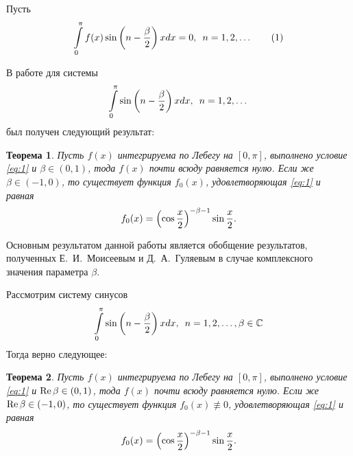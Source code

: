 \documentclass[oneside, final, 14pt]{extreport}
\newtheorem{theorem}{Теорема}
\begin{document}
Пусть \begin{equation}\int\limits_0^{\pi}f(x)\sin\left(n - \frac{\beta}{2}\right)xdx = 0, \enspace n = 1, 2, \dots \tag{1} \label{eq:1}\end{equation}

	В работе \cite{moiseev-2018} для системы $$\int\limits_0^{\pi}\sin\left(n - \frac{\beta}{2}\right)xdx, \enspace n = 1, 2, \dots$$ был получен следующий результат:
	
	\begin{theorem}
		Пусть $f(x)$ интегрируема по Лебегу на $[0, \pi]$, выполнено условие
		\eqref{eq:1} и $\beta\in(0, 1)$, тода $f(x)$ почти всюду равняется нулю. 
		Если же  $\beta\in(-1, 0)$, то существует функция $f_0(x)$, 
		удовлетворяющая \eqref{eq:1} и равная $$f_0(x) = \left(\cos\frac{x}{2}\right)^{-\beta-1}\sin\frac{x}{2}.$$
	\end{theorem}
	
	Основным результатом данной работы является обобщение результатов, полученных Е.~И.~Моисеевым 
	и Д.~А.~Гуляевым в случае комплексного значения параметра $\beta$.
	
	
	Рассмотрим систему синусов $$\int\limits_0^{\pi}\sin\left(n - \frac{\beta}{2}\right)xdx, \enspace n = 1, 2, \dots, \beta\in\mathbb{C}$$
	Тогда верно следующее:
	\begin{theorem}
		Пусть $f(x)$ интегрируема по Лебегу на $[0, \pi]$, выполнено условие 
		\eqref{eq:1} и \thinspace $\operatorname{Re}\beta \in (0, 1)$, 
		тода $f(x)$ почти всюду равняется нулю. Если же \thinspace  
		$\operatorname{Re}\beta \in (-1, 0)$, то существует функция $f_0(x) \not\equiv 0$, 
		удовлетворяющая \eqref{eq:1} и равная $$f_0(x) = \left(\cos\frac{x}{2}\right)^{-\beta-1}\sin\frac{x}{2}.$$
	\end{theorem}
	
\end{document}
